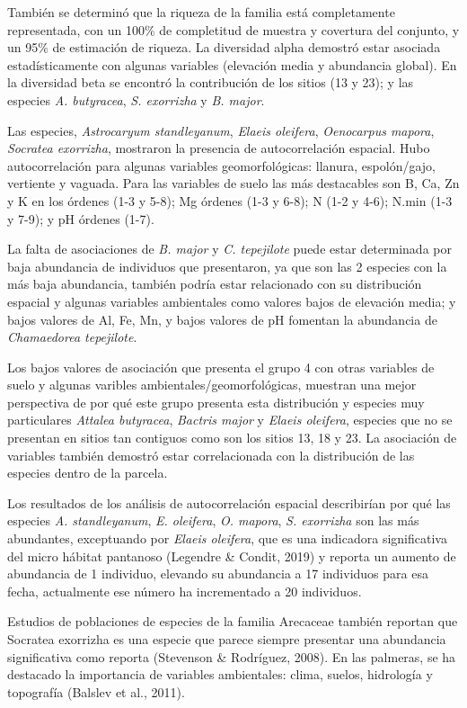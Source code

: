 \documentclass[11pt,]{article}
\begin{document}
También se determinó que la riqueza de la familia está completamente
representada, con un 100\% de completitud de muestra y covertura del
conjunto, y un 95\% de estimación de riqueza. La diversidad alpha
demostró estar asociada estadísticamente con algunas variables
(elevación media y abundancia global). En la diversidad beta se encontró
la contribución de los sitios (13 y 23); y las especies \emph{A.
butyracea}, \emph{S. exorrizha} y \emph{B. major}.

Las especies, \emph{Astrocaryum standleyanum}, \emph{Elaeis oleifera},
\emph{Oenocarpus mapora}, \emph{Socratea exorrizha}, mostraron la
presencia de autocorrelación espacial. Hubo autocorrelación para algunas
variables geomorfológicas: llanura, espolón/gajo, vertiente y vaguada.
Para las variables de suelo las más destacables son B, Ca, Zn y K en los
órdenes (1-3 y 5-8); Mg órdenes (1-3 y 6-8); N (1-2 y 4-6); N.min (1-3 y
7-9); y pH órdenes (1-7).

La falta de asociaciones de \emph{B. major} y \emph{C. tepejilote} puede
estar determinada por baja abundancia de individuos que presentaron, ya
que son las 2 especies con la más baja abundancia, también podría estar
relacionado con su distribución espacial y algunas variables ambientales
como valores bajos de elevación media; y bajos valores de Al, Fe, Mn, y
bajos valores de pH fomentan la abundancia de \emph{Chamaedorea
tepejilote}.

Los bajos valores de asociación que presenta el grupo 4 con otras
variables de suelo y algunas varibles ambientales/geomorfológicas,
muestran una mejor perspectiva de por qué este grupo presenta esta
distribución y especies muy particulares \emph{Attalea butyracea},
\emph{Bactris major} y \emph{Elaeis oleifera}, especies que no se
presentan en sitios tan contiguos como son los sitios 13, 18 y 23. La
asociación de variables también demostró estar correlacionada con la
distribución de las especies dentro de la parcela.

Los resultados de los análisis de autocorrelación espacial describirían
por qué las especies \emph{A. standleyanum}, \emph{E. oleifera},
\emph{O. mapora}, \emph{S. exorrizha} son las más abundantes,
exceptuando por \emph{Elaeis oleifera}, que es una indicadora
significativa del micro hábitat pantanoso (Legendre \& Condit, 2019) y
reporta un aumento de abundancia de 1 individuo, elevando su abundancia
a 17 individuos para esa fecha, actualmente ese número ha incrementado a
20 individuos.

Estudios de poblaciones de especies de la familia Arecaceae también
reportan que Socratea exorrizha es una especie que parece siempre
presentar una abundancia significativa como reporta (Stevenson \&
Rodríguez, 2008). En las palmeras, se ha destacado la importancia de
variables ambientales: clima, suelos, hidrología y topografía (Balslev
et al., 2011).
\end{document}
